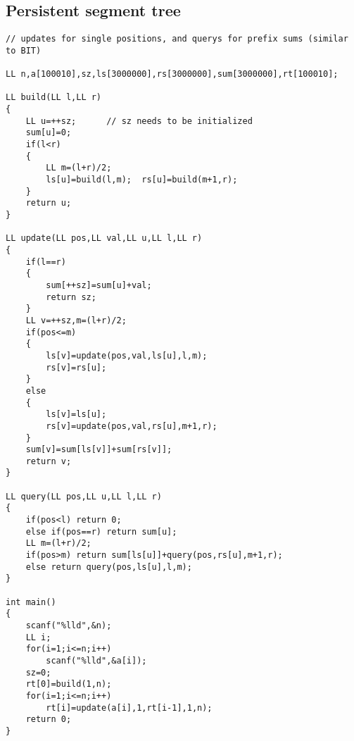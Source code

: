 \documentclass[a4paper,12pt]{article}
\begin{document}
\subsection{Persistent segment tree}
\begin{lstlisting}
// updates for single positions, and querys for prefix sums (similar to BIT)

LL n,a[100010],sz,ls[3000000],rs[3000000],sum[3000000],rt[100010];

LL build(LL l,LL r)
{
    LL u=++sz;      // sz needs to be initialized
    sum[u]=0;
    if(l<r)
    {
        LL m=(l+r)/2;
        ls[u]=build(l,m);  rs[u]=build(m+1,r);
    }
    return u;
}

LL update(LL pos,LL val,LL u,LL l,LL r)
{
    if(l==r)
    {
        sum[++sz]=sum[u]+val;
        return sz;
    }
    LL v=++sz,m=(l+r)/2;
    if(pos<=m)
    {
        ls[v]=update(pos,val,ls[u],l,m);
        rs[v]=rs[u];
    }
    else
    {
        ls[v]=ls[u];
        rs[v]=update(pos,val,rs[u],m+1,r);
    }
    sum[v]=sum[ls[v]]+sum[rs[v]];
    return v;
}

LL query(LL pos,LL u,LL l,LL r)
{
    if(pos<l) return 0;
    else if(pos==r) return sum[u];
    LL m=(l+r)/2;
    if(pos>m) return sum[ls[u]]+query(pos,rs[u],m+1,r);
    else return query(pos,ls[u],l,m);
}

int main()
{
    scanf("%lld",&n);
    LL i;
    for(i=1;i<=n;i++)
        scanf("%lld",&a[i]);
    sz=0;
    rt[0]=build(1,n);
    for(i=1;i<=n;i++)
        rt[i]=update(a[i],1,rt[i-1],1,n);
    return 0;
}
\end{lstlisting}
\end{document}
